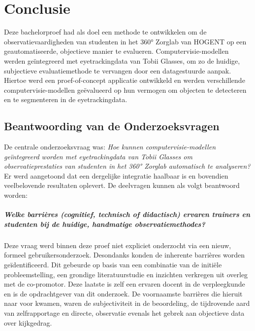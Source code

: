 
\chapter{Conclusie}%
\label{ch:conclusie}


Deze bachelorproef had als doel een methode te ontwikkelen om de observatievaardigheden van 
studenten in het 360° Zorglab van HOGENT op een geautomatiseerde, objectieve manier te evalueren.
Computervisie-modellen werden geïntegreerd met eyetrackingdata van Tobii Glasses, om zo de huidige, 
subjectieve evaluatiemethode te vervangen door een datagestuurde aanpak.
Hiertoe werd een proef-of-concept applicatie ontwikkeld en werden verschillende computervisie-modellen 
geëvalueerd op hun vermogen om objecten te detecteren en te segmenteren in de eyetrackingdata.

\section{Beantwoording van de Onderzoeksvragen}

De centrale onderzoeksvraag was: 
\textit{Hoe kunnen computervisie-modellen geïntegreerd worden met eyetrackingdata van Tobii Glasses om observatieprestaties 
van studenten in het 360° Zorglab automatisch te analyseren?}
Er werd aangetoond dat een dergelijke integratie haalbaar is en bovendien veelbelovende resultaten oplevert.
De deelvragen kunnen als volgt beantwoord worden:

\paragraph{\textit{Welke barrières (cognitief, technisch of didactisch) ervaren trainers en studenten bij de huidige, handmatige observatiemethodes?}}
Deze vraag werd binnen deze proef niet expliciet onderzocht via een nieuw, formeel gebruikersonderzoek. 
Desondanks konden de inherente barrières worden geïdentificeerd. 
Dit gebeurde op basis van een combinatie van de initiële probleemstelling, een grondige literatuurstudie en inzichten verkregen uit overleg met de co-promotor. 
Deze laatste is zelf een ervaren docent in de verpleegkunde en is de opdrachtgever van dit onderzoek. 
De voornaamste barrières die hieruit naar voor kwamen, waren de subjectiviteit in de beoordeling, 
de tijdrovende aard van zelfrapportage en directe, observatie evenals het gebrek aan objectieve data over kijkgedrag.  
    
